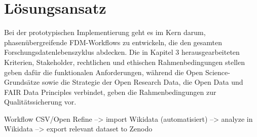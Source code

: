 \onehalfspacing

\section{Lösungsansatz}

Bei der prototypischen Implementierung geht es im Kern darum, phasenübergreifende FDM-Workflows zu entwickeln, die den gesamten Forschungsdatenlebenszyklus abdecken. Die in Kapitel 3 herausgearbeiteten Kriterien, Stakeholder, rechtlichen und ethischen Rahmenbedingungen stellen geben dafür die funktionalen Anforderungen, während die Open Science-Grundsätze sowie die Strategie der Open Research Data, die Open Data und FAIR Data Principles verbindet, geben die Rahmenbedingungen zur Qualitätssicherung vor.

Workflow CSV/Open Refine --> import Wikidata (automatisiert) --> analyze in Wikidata --> export relevant dataset to Zenodo


